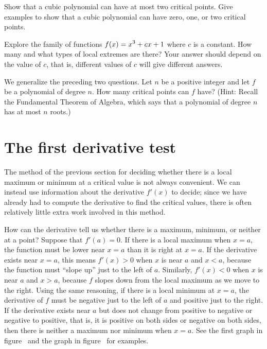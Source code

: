 \begin{exercises}
\begin{exercise} Show that a cubic polynomial can have at most two critical
points. Give examples to show that a cubic polynomial can have zero,
one, or two critical points.
\end{exercise}

\begin{exercise} Explore the family of functions $\displaystyle f(x) = x^3 + cx +1$ where $c$
 is a constant.  How many and what types of local extremes are there?
 Your answer should depend on the value of $c$, that is, different
 values of $c$ will give different answers.
\end{exercise}

\begin{exercise} We generalize the preceding two questions. Let $n$ be a
positive integer and let $f$ be a polynomial of degree $n$. How many
critical points can $f$ have? (Hint: Recall the {\dfont Fundamental
  Theorem of Algebra}, 
which says that a polynomial of degree $n$ has
  at most $n$ roots.)
\end{exercise}

\end{exercises}


\section{The first derivative test} {}{}
\nobreak
The method of the previous section for deciding whether there is a
local maximum or minimum at a critical value is not always
convenient. We can instead use information about the derivative
$f'(x)$ to decide; since we have already had to compute the derivative
to find the critical values, there is often relatively little extra
work involved in this method.

How can the derivative tell us whether there is a maximum, minimum, or
neither at a point? Suppose that $f'(a)=0$. If there is a local
maximum when $x=a$, the function must be lower near $x=a$ than it is
right at $x=a$. If the derivative exists near $x=a$, this means
$f'(x)>0$ when $x$ is near $a$ and $x<a$, because the function must
``slope up'' just to the left of $a$. Similarly, $f'(x)<0$ when $x$ is
near $a$ and $x>a$, because $f$ slopes down from the local maximum as
we move to the right. Using the same reasoning, if there is a local
minimum at $x=a$, the derivative of $f$ must be negative just to the
left of $a$ and positive just to the right. If the derivative exists
near $a$ but does not change from positive to negative or negative to
positive, that is, it is positive on both sides or negative on both
sides, then there is neither a maximum nor minimum when $x=a$.
See the first graph in figure~
and the graph in figure~
for examples.

